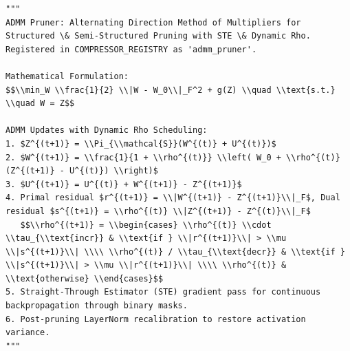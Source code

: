 \begin{lstlisting}
"""
ADMM Pruner: Alternating Direction Method of Multipliers for Structured \& Semi-Structured Pruning with STE \& Dynamic Rho.
Registered in COMPRESSOR_REGISTRY as 'admm_pruner'.

Mathematical Formulation:
$$\\min_W \\frac{1}{2} \\|W - W_0\\|_F^2 + g(Z) \\quad \\text{s.t.} \\quad W = Z$$

ADMM Updates with Dynamic Rho Scheduling:
1. $Z^{(t+1)} = \\Pi_{\\mathcal{S}}(W^{(t)} + U^{(t)})$
2. $W^{(t+1)} = \\frac{1}{1 + \\rho^{(t)}} \\left( W_0 + \\rho^{(t)} (Z^{(t+1)} - U^{(t)}) \\right)$
3. $U^{(t+1)} = U^{(t)} + W^{(t+1)} - Z^{(t+1)}$
4. Primal residual $r^{(t+1)} = \\|W^{(t+1)} - Z^{(t+1)}\\|_F$, Dual residual $s^{(t+1)} = \\rho^{(t)} \\|Z^{(t+1)} - Z^{(t)}\\|_F$
   $$\\rho^{(t+1)} = \\begin{cases} \\rho^{(t)} \\cdot \\tau_{\\text{incr}} & \\text{if } \\|r^{(t+1)}\\| > \\mu \\|s^{(t+1)}\\| \\\\ \\rho^{(t)} / \\tau_{\\text{decr}} & \\text{if } \\|s^{(t+1)}\\| > \\mu \\|r^{(t+1)}\\| \\\\ \\rho^{(t)} & \\text{otherwise} \\end{cases}$$
5. Straight-Through Estimator (STE) gradient pass for continuous backpropagation through binary masks.
6. Post-pruning LayerNorm recalibration to restore activation variance.
"""


\end{lstlisting}
